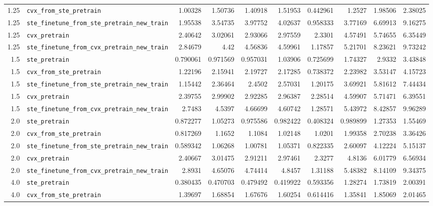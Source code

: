 \begin{longtable}{@{}r l *{8}{r}@{}}
1.25 & \texttt{cvx\_from\_ste\_pretrain} & 1.00328 & 1.50736 & 1.40918 & 1.51953 & 0.442961 & 1.2527 & 1.98506 & 2.38025 \\
1.25 & \texttt{ste\_finetune\_from\_ste\_pretrain\_new\_train} & 1.95538 & 3.54735 & 3.97752 & 4.02637 & 0.958333 & 3.77169 & 6.69913 & 9.16275 \\
1.25 & \texttt{cvx\_pretrain} & 2.40642 & 3.02061 & 2.93066 & 2.97559 & 2.3301 & 4.57491 & 5.74655 & 6.35449 \\
1.25 & \texttt{ste\_finetune\_from\_cvx\_pretrain\_new\_train} & 2.84679 & 4.42 & 4.56836 & 4.59961 & 1.17857 & 5.21701 & 8.23621 & 9.73242 \\
1.5 & \texttt{ste\_pretrain} & 0.790061 & 0.971569 & 0.957031 & 1.03906 & 0.725699 & 1.74327 & 2.9332 & 3.43848 \\
1.5 & \texttt{cvx\_from\_ste\_pretrain} & 1.22196 & 2.15941 & 2.19727 & 2.17285 & 0.738372 & 2.23982 & 3.53147 & 4.15723 \\
1.5 & \texttt{ste\_finetune\_from\_ste\_pretrain\_new\_train} & 1.15442 & 2.36464 & 2.4502 & 2.57031 & 1.20175 & 3.69921 & 5.81612 & 7.44434 \\
1.5 & \texttt{cvx\_pretrain} & 2.39755 & 2.99902 & 2.92285 & 2.96387 & 2.28514 & 4.59907 & 5.71471 & 6.39551 \\
1.5 & \texttt{ste\_finetune\_from\_cvx\_pretrain\_new\_train} & 2.7483 & 4.5397 & 4.66699 & 4.60742 & 1.28571 & 5.43972 & 8.42857 & 9.96289 \\
2.0 & \texttt{ste\_pretrain} & 0.872277 & 1.05273 & 0.975586 & 0.982422 & 0.408324 & 0.989899 & 1.27353 & 1.55469 \\
2.0 & \texttt{cvx\_from\_ste\_pretrain} & 0.817269 & 1.1652 & 1.1084 & 1.02148 & 1.0201 & 1.99358 & 2.70238 & 3.36426 \\
2.0 & \texttt{ste\_finetune\_from\_ste\_pretrain\_new\_train} & 0.589342 & 1.06268 & 1.00781 & 1.05371 & 0.822335 & 2.60097 & 4.12224 & 5.15137 \\
2.0 & \texttt{cvx\_pretrain} & 2.40667 & 3.01475 & 2.91211 & 2.97461 & 2.3277 & 4.8136 & 6.01779 & 6.56934 \\
2.0 & \texttt{ste\_finetune\_from\_cvx\_pretrain\_new\_train} & 2.8931 & 4.65076 & 4.74414 & 4.8457 & 1.31188 & 5.48382 & 8.14109 & 9.34375 \\
4.0 & \texttt{ste\_pretrain} & 0.380435 & 0.470703 & 0.479492 & 0.419922 & 0.593356 & 1.28274 & 1.73819 & 2.00391 \\
4.0 & \texttt{cvx\_from\_ste\_pretrain} & 1.39697 & 1.68854 & 1.67676 & 1.60254 & 0.614416 & 1.35841 & 1.85069 & 2.01465 \\

\end{longtable}
